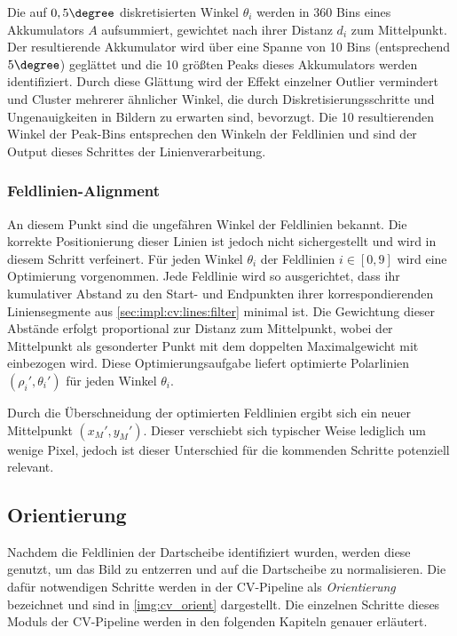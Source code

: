 Die auf $0,5\degree$ diskretisierten Winkel $\theta_i$ werden in 360 Bins eines Akkumulators $A$ aufsummiert, gewichtet nach ihrer Distanz $d_i$ zum Mittelpunkt. Der resultierende Akkumulator wird über eine Spanne von 10 Bins (entsprechend $5\degree$) geglättet und die 10 größten Peaks dieses Akkumulators werden identifiziert. Durch diese Glättung wird der Effekt einzelner Outlier vermindert und Cluster mehrerer ähnlicher Winkel, die durch Diskretisierungsschritte und Ungenauigkeiten in Bildern zu erwarten sind, bevorzugt. Die 10 resultierenden Winkel der Peak-Bins entsprechen den Winkeln der Feldlinien und sind der Output dieses Schrittes der Linienverarbeitung.

\subsubsection{Feldlinien-Alignment}
\label{sec:impl:cv:lines:lines_align}

An diesem Punkt sind die ungefähren Winkel der Feldlinien bekannt. Die korrekte Positionierung dieser Linien ist jedoch nicht sichergestellt und wird in diesem Schritt verfeinert. Für jeden Winkel $\theta_i$ der Feldlinien $i \in [0,9]$ wird eine Optimierung vorgenommen. Jede Feldlinie wird so ausgerichtet, dass ihr kumulativer Abstand zu den Start- und Endpunkten ihrer korrespondierenden Liniensegmente aus \autoref{sec:impl:cv:lines:filter} minimal ist. Die Gewichtung dieser Abstände erfolgt proportional zur Distanz zum Mittelpunkt, wobei der Mittelpunkt als gesonderter Punkt mit dem doppelten Maximalgewicht mit einbezogen wird. Diese Optimierungsaufgabe liefert optimierte Polarlinien $(\rho_i', \theta_i')$ für jeden Winkel $\theta_i$.

Durch die Überschneidung der optimierten Feldlinien ergibt sich ein neuer Mittelpunkt $(x_M', y_M')$. Dieser verschiebt sich typischer Weise lediglich um wenige Pixel, jedoch ist dieser Unterschied für die kommenden Schritte potenziell relevant.



\subsection{Orientierung}
\label{sec:impl:cv:orient}

Nachdem die Feldlinien der Dartscheibe identifiziert wurden, werden diese genutzt, um das Bild zu entzerren und auf die Dartscheibe zu normalisieren. Die dafür notwendigen Schritte werden in der CV-Pipeline als \textit{Orientierung} bezeichnet und sind in \autoref{img:cv_orient} dargestellt. Die einzelnen Schritte dieses Moduls der CV-Pipeline werden in den folgenden Kapiteln genauer erläutert.


